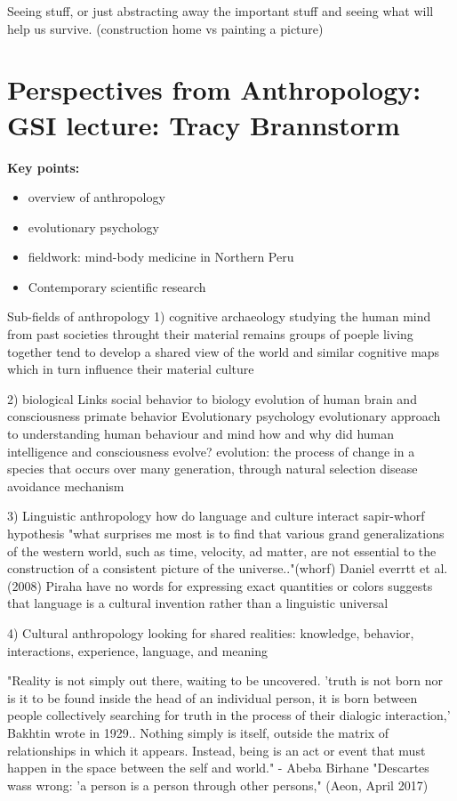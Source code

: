 \documentclass{article}
\begin{document}
Seeing stuff, or just abstracting away the important stuff and seeing what will help us survive. (construction home vs painting a picture) 


\section{Perspectives from Anthropology: GSI lecture: Tracy Brannstorm}
\textbf{Key points:}
\begin{itemize}
    \item overview of anthropology
    \item evolutionary psychology
    \item fieldwork: mind-body medicine in Northern Peru
    \item Contemporary scientific research
\end{itemize}

Sub-fields of anthropology
1) cognitive archaeology
studying the human mind from past societies throught their material remains
    groups of poeple living together tend to develop a shared view of the world and similar cognitive maps which in turn influence their material culture

2) biological
    Links social behavior to biology
    evolution of human brain and consciousness
    primate behavior 
Evolutionary psychology 
    evolutionary approach to understanding human behaviour and mind
    how and why did human intelligence and consciousness evolve? 
    evolution: the process of change in a species that occurs over many generation, through natural selection
    disease avoidance mechanism
    
3) Linguistic anthropology
    how do language and culture interact
    sapir-whorf hypothesis 
        "what surprises me most is to find that various grand generalizations of the western world, such as time, velocity, ad matter, are not essential to the construction of a consistent picture of the universe.."(whorf) 
    Daniel everrtt et al. (2008) 
        Piraha have no words for expressing exact quantities or colors
        suggests that language is a cultural invention rather than a linguistic universal

4) Cultural anthropology 
    looking for shared realities: knowledge, behavior, interactions, experience, language, and meaning
    
    "Reality is not simply out there, waiting to be uncovered. 'truth is not born nor is it to be found inside the head of an individual person, it is born between people collectively searching for truth in the process of their dialogic interaction,' Bakhtin wrote in 1929.. Nothing simply is itself, outside the matrix of relationships in which it appears. Instead, being is an act or event that must happen in the space between the self and world." - Abeba Birhane "Descartes wass wrong: 'a person is a person through other persons," (Aeon, April 2017) 
    
\end{document}
